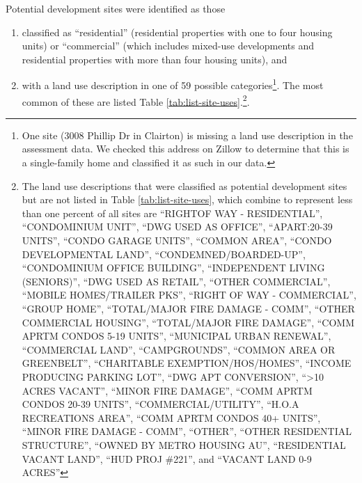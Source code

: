 \documentclass[
]{book}
\begin{document}
Potential development sites were identified as those

\begin{enumerate}
\def\labelenumi{\arabic{enumi}.}
\item
  classified as ``residential'' (residential properties with one to
  four housing units) or ``commercial'' (which includes mixed-use developments
  and residential properties with more than four housing units), and
\item
  with a land use description in one of 59 possible categories\footnote{One site (3008
    Phillip Dr in Clairton) is missing a land use description in the assessment data.
    We checked this address on Zillow to determine that this is a single-family home
    and classified it as such in our data.}. The most common of these are listed Table \ref{tab:list-site-uses}.\footnote{The land use descriptions that were
    classified as potential development sites but are not listed in Table
    \ref{tab:list-site-uses}, which combine to represent less than one percent of all sites
    are ``RIGHTOF WAY - RESIDENTIAL'', ``CONDOMINIUM UNIT'', ``DWG USED AS OFFICE'',
    ``APART:20-39 UNITS'', ``CONDO GARAGE UNITS'', ``COMMON AREA'', ``CONDO DEVELOPMENTAL
    LAND'', ``CONDEMNED/BOARDED-UP'', ``CONDOMINIUM OFFICE BUILDING'', ``INDEPENDENT LIVING
    (SENIORS)'', ``DWG USED AS RETAIL'', ``OTHER COMMERCIAL'', ``MOBILE HOMES/TRAILER PKS'',
    ``RIGHT OF WAY - COMMERCIAL'', ``GROUP HOME'', ``TOTAL/MAJOR FIRE DAMAGE - COMM'',
    ``OTHER COMMERCIAL HOUSING'', ``TOTAL/MAJOR FIRE DAMAGE'', ``COMM APRTM CONDOS 5-19
    UNITS'', ``MUNICIPAL URBAN RENEWAL'', ``COMMERCIAL LAND'', ``CAMPGROUNDS'', ``COMMON AREA
    OR GREENBELT'', ``CHARITABLE EXEMPTION/HOS/HOMES'', ``INCOME PRODUCING PARKING LOT'',
    ``DWG APT CONVERSION'', ``\textgreater10 ACRES VACANT'', ``MINOR FIRE DAMAGE'', ``COMM APRTM CONDOS
    20-39 UNITS'', ``COMMERCIAL/UTILITY'',
    ``H.O.A RECREATIONS AREA'', ``COMM APRTM CONDOS 40+ UNITS'', ``MINOR FIRE DAMAGE - COMM'',
    ``OTHER'', ``OTHER RESIDENTIAL STRUCTURE'', ``OWNED BY METRO HOUSING AU'', ``RESIDENTIAL VACANT
    LAND'', ``HUD PROJ \#221'', and ``VACANT LAND 0-9 ACRES''}.
\end{enumerate}
\end{document}
